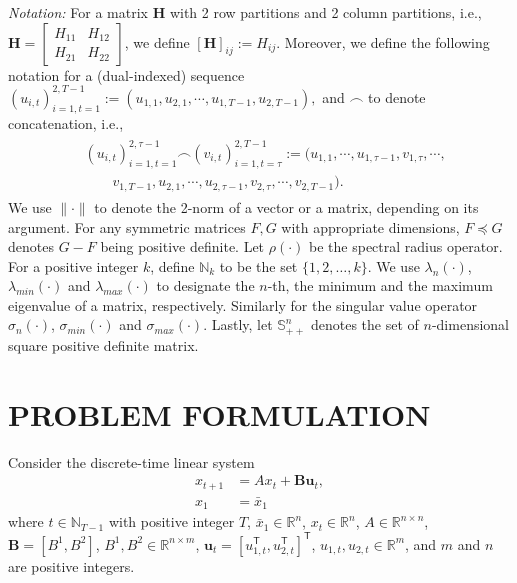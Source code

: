 \documentclass[letterpaper, 10 pt, conference]{ieeeconf}  %
\newcommand{\transpose}{\mathsf{T}}
\begin{document}
\emph{Notation:}
For a matrix $\mathbf{H}$ with 2 row partitions and 2 column partitions, i.e.,
    $\mathbf{H} = 
    \begin{bmatrix}
        H_{11} & H_{12}\\
        H_{21} & H_{22}
    \end{bmatrix}$,
we define
    $[\mathbf{H}]_{ij} := H_{ij}$.
Moreover, we define the following notation for a (dual-indexed) sequence
$(u_{i,t})_{i=1,t=1}^{2,T-1} := (u_{1,1},u_{2,1},\cdots, u_{1,T-1},u_{2,T-1}),
$
and $\frown$ to denote concatenation, i.e.,
\begin{align*}
    \begin{split}
    &(u_{i,t})_{i=1,t=1}^{2,\tau-1} \frown (v_{i,t})_{i=1,t=\tau}^{2,T-1}:=(u_{1,1},\cdots,u_{1,\tau-1},v_{1,\tau},\cdots,\\
    &\qquad v_{1,T-1},u_{2,1},\cdots,u_{2,\tau-1},v_{2,\tau},\cdots,v_{2,T-1} ).
    \end{split}
\end{align*}
We use $\|\cdot\|$ to denote the 2-norm of a vector or a matrix, depending on its argument. For any symmetric matrices $F,G$ with appropriate dimensions, $F \preceq G$ denotes $G-F$ being positive definite. Let $\rho(\cdot)$ be the spectral radius operator. For a positive integer $k$, define $\mathbb{N}_k$ to be the set $\{1,2,\dots,k\}$. We use $\lambda_{n}(\cdot)$, $\lambda_{min}(\cdot)$ and $\lambda_{max}(\cdot)$ to designate the $n$-th, the minimum and the maximum eigenvalue of a matrix, respectively. Similarly for the singular value operator $\sigma_{n}(\cdot)$, $\sigma_{min}(\cdot)$ and $\sigma_{max}(\cdot)$. Lastly, let $\mathbb{S}_{++}^{n}$ denotes the set of $n$-dimensional square positive definite matrix.

\section{PROBLEM FORMULATION}
\label{sec:problem_formulation}


Consider the discrete-time linear system
\begin{align}
    x_{t+1} &= Ax_{t} + \mathbf{B}\mathbf{u}_{t}\label{eq:linsys},\\
    x_{1} &=\bar{x}_{1} \label{eq:initialx}
\end{align}
where $t \in \mathbb{N}_{T-1}$ with positive integer $T$, $\bar{x}_1 \in \mathbb{R}^{n}$, $x_{t}\in\mathbb{R}^n$, $A \in \mathbb{R}^{n\times n}$, $\mathbf{B} = [B^{1}, B^{2}]$, $B^{1},B^{2} \in \mathbb{R}^{n\times m}$, $\mathbf{u}_{t} = [u_{1,t}^{\transpose}, u_{2,t}^{\transpose}]^{\transpose}$, $u_{1,t}, u_{2,t} \in \mathbb{R}^{m}$, and $m$ and $n$ are positive integers.
\end{document}
